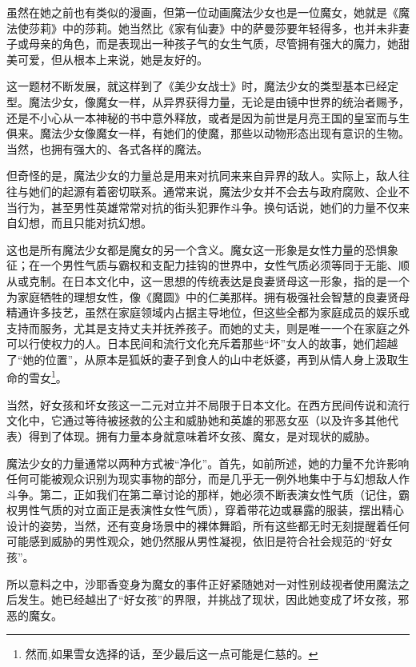 虽然在她之前也有类似的漫画，但第一位动画魔法少女也是一位魔女，她就是《魔法使莎莉》中的莎莉。她当然比《家有仙妻》中的萨曼莎要年轻得多，也并未非妻子或母亲的角色，而是表现出一种孩子气的女生气质，尽管拥有强大的魔力，她甜美可爱，但从根本上来说，她是友好的\cite{ref50}。

这一题材不断发展，就这样到了《美少女战士》时，魔法少女的类型基本已经定型。魔法少女，像魔女一样，从异界获得力量，无论是由镜中世界的统治者赐予，还是不小心从一本神秘的书中意外释放，或者是因为前世是月亮王国的皇室而与生俱来。魔法少女像魔女一样，有她们的使魔，那些以动物形态出现有意识的生物。当然，也拥有强大的、各式各样的魔法。

但奇怪的是，魔法少女的力量总是用来对抗同来来自异界的敌人。实际上，敌人往往与她们的起源有着密切联系。通常来说，魔法少女并不会去与政府腐败、企业不当行为，甚至男性英雄常常对抗的街头犯罪作斗争。换句话说，她们的力量不仅来自幻想，而且只能对抗幻想。

这也是所有魔法少女都是魔女的另一个含义。魔女这一形象是女性力量的恐惧象征；在一个男性气质与霸权和支配力挂钩的世界中，女性气质必须等同于无能、顺从或克制\cite{ref51}。在日本文化中，这一思想的传统表达是良妻贤母这一形象，指的是一个为家庭牺牲的理想女性，像《魔圆》中的仁美那样。拥有极强社会智慧的良妻贤母精通许多技艺，虽然在家庭领域内占据主导地位，但这些全都为家庭成员的娱乐或支持而服务，尤其是支持丈夫并抚养孩子。而她的丈夫，则是唯一一个在家庭之外可以行使权力的人\cite{ref52}。日本民间和流行文化充斥着那些“坏”女人的故事，她们超越了“她的位置”，从原本是狐妖的妻子\cite{ref53}到食人的山中老妖婆\cite{ref54}，再到从情人身上汲取生命的雪女\footnote{然而,如果雪女选择的话，至少最后这一点可能是仁慈的。}\cite{ref55}。

当然，好女孩和坏女孩这一二元对立并不局限于日本文化。在西方民间传说和流行文化中，它通过等待被拯救的公主和威胁她和英雄的邪恶女巫（以及许多其他代表）得到了体现。拥有力量本身就意味着坏女孩、魔女，是对现状的威胁。\cite{ref56}

魔法少女的力量通常以两种方式被“净化”。首先，如前所述，她的力量不允许影响任何可能被观众识别为现实事物的部分，而是几乎无一例外地集中于与幻想敌人作斗争。第二，正如我们在第二章讨论的那样，她必须不断表演女性气质（记住，霸权男性气质的对立面正是表演性女性气质），穿着带花边或暴露的服装，摆出精心设计的姿势，当然，还有变身场景中的裸体舞蹈，所有这些都无时无刻提醒着任何可能感到威胁的男性观众，她仍然服从男性凝视，依旧是符合社会规范的“好女孩”。

所以意料之中，沙耶香变身为魔女的事件正好紧随她对一对性别歧视者使用魔法之后发生。她已经越出了“好女孩”的界限，并挑战了现状，因此她变成了坏女孩，邪恶的魔女。

